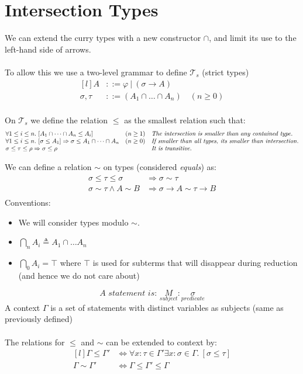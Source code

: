 \chapter{Intersection Types}
We can extend the curry types with a new constructor $\cap$, and limit its use to the left-hand side of arrows.
\\
\\ To allow this we use a two-level grammar to define $\mathcal{T}_s$ (strict types)
\[\begin{matrix*}[l]
    A & ::= \varphi \ | \ (\sigma \to A) \\
    \sigma, \tau & ::= (A_1 \cap \dots \cap A_n) \quad (n \geq 0) \\
\end{matrix*}\]

On $\mathcal{T}_s$ we define the relation $\leq$ as the smallest relation such that:
\[\begin{matrix*}[l]
    \forall 1 \leq i \leq n . \ [A_1 \cap \dots \cap A_n \leq A_i] & (n \geq 1)  & \text{\textit{The intersection is smaller than any contained type.}}\\
    \forall 1 \leq i \leq n . \ [\sigma \leq A_1] \Rightarrow \sigma \leq A_1 \cap \dots \cap A_n & (n \geq 0) & \text{\textit{If smaller than all types, its smaller than intersection.}}\\
    \sigma \leq \tau \leq \rho \Rightarrow \sigma \leq \rho & & \text{\textit{It is transitive.}}\\
\end{matrix*}\]

We can define a relation $\sim$ on types (considered \textit{equals}) as:
\[\begin{split}
    \sigma \leq \tau \leq \sigma &\Rightarrow \sigma \sim \tau \\
    \sigma \sim \tau \land A \sim B & \Rightarrow \sigma \to A \sim \tau \to B \\
\end{split}\]
Conventions:
\begin{itemize}
    \item We will consider types modulo $\sim$.
    \item $\bigcap_nA_i \triangleq A_1 \cap \dots A_n$
    \item $\bigcap_0A_i = \top$ where $\top$ is used for subterms that will disappear during reduction (and hence we do not care about)
\end{itemize}

\[\textit{A statement is: } \underset{\textit{subject}}{M} : \underset{\textit{predicate}}{\sigma}\]
A context $\Gamma$ is a set of statements with distinct variables as subjects (same as previously defined)
\\
\\ The relations for $\leq$ and $\sim$ can be extended to context by:
\[\begin{matrix*}[l]
    \Gamma \leq \Gamma' & \Leftrightarrow \forall x : \tau \in \Gamma' \exists x : \sigma \in \Gamma . \ [\sigma \leq \tau] \\
    \Gamma \sim \Gamma' & \Leftrightarrow \Gamma \leq \Gamma' \leq \Gamma \\
\end{matrix*}\]


